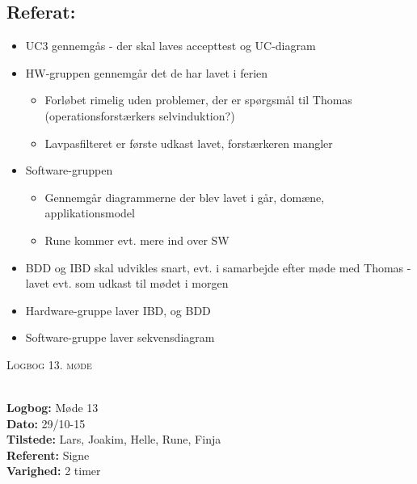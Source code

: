 \documentclass[a4paper,11pt,oneside]{memoir}
\begin{document}
\subsection{Referat:}
\begin{itemize}
\item UC3 gennemgås - der skal laves accepttest og UC-diagram
\item HW-gruppen gennemgår det de har lavet i ferien 
\begin{itemize}
\item Forløbet rimelig uden problemer, der er spørgsmål til Thomas (operationsforstærkers selvinduktion?)
\item Lavpasfilteret er første udkast lavet, forstærkeren mangler 
\end{itemize}
\item Software-gruppen
\begin{itemize}
\item Gennemgår diagrammerne der blev lavet i går, domæne, applikationsmodel
\item Rune kommer evt. mere ind over SW 
\end{itemize}
\item BDD og IBD skal udvikles snart, evt. i samarbejde efter møde med Thomas - lavet evt. som udkast til mødet i morgen
\item Hardware-gruppe laver IBD, og BDD
\item Software-gruppe laver sekvensdiagram
\end{itemize}

\newpage


\begin{center} 
\huge{\textsc{Logbog 13. møde}}
\end{center}

\textbf{ }
\\
\textbf{Logbog:} Møde 13
\\
\textbf{Dato:} 29/10-15
\\
\textbf{Tilstede:} Lars, Joakim, Helle, Rune, Finja
\\
\textbf{Referent:} Signe
\\
\textbf{Varighed:} 2 timer
\\
\end{document}
